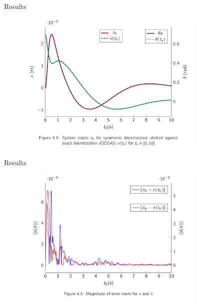 \documentclass{beamer}
\begin{document}
\begin{frame}{Results}
  \begin{figure}[h]
    \centering
    \includegraphics[width=0.8\textwidth]{../Figures/ex2_states.png}
  \end{figure}
\end{frame}

\begin{frame}{Results}
  \begin{figure}[h]
    \centering
    \includegraphics[width=0.8\textwidth]{../Figures/ex2_err1.png}
  \end{figure}
\end{frame}
\end{document}

